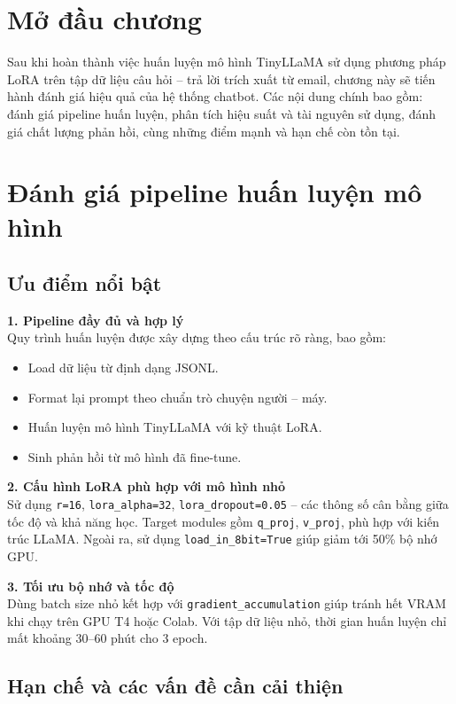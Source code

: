 \documentclass[../DoAn.tex]{subfiles}
\begin{document}
\section{Mở đầu chương}
Sau khi hoàn thành việc huấn luyện mô hình TinyLLaMA sử dụng phương pháp LoRA trên tập dữ liệu câu hỏi – trả lời trích xuất từ email, chương này sẽ tiến hành đánh giá hiệu quả của hệ thống chatbot. Các nội dung chính bao gồm: đánh giá pipeline huấn luyện, phân tích hiệu suất và tài nguyên sử dụng, đánh giá chất lượng phản hồi, cùng những điểm mạnh và hạn chế còn tồn tại.

\section{Đánh giá pipeline huấn luyện mô hình}

\subsection{Ưu điểm nổi bật}

\textbf{1. Pipeline đầy đủ và hợp lý} \\ 
Quy trình huấn luyện được xây dựng theo cấu trúc rõ ràng, bao gồm:
\begin{itemize}
    \item Load dữ liệu từ định dạng JSONL.
    \item Format lại prompt theo chuẩn trò chuyện người – máy.
    \item Huấn luyện mô hình TinyLLaMA với kỹ thuật LoRA.
    \item Sinh phản hồi từ mô hình đã fine-tune.
\end{itemize}

\textbf{2. Cấu hình LoRA phù hợp với mô hình nhỏ} \\ 
Sử dụng \texttt{r=16}, \texttt{lora\_alpha=32}, \texttt{lora\_dropout=0.05} – các thông số cân bằng giữa tốc độ và khả năng học. Target modules gồm \texttt{q\_proj}, \texttt{v\_proj}, phù hợp với kiến trúc LLaMA. Ngoài ra, sử dụng \texttt{load\_in\_8bit=True} giúp giảm tới 50\% bộ nhớ GPU.

\textbf{3. Tối ưu bộ nhớ và tốc độ} \\ 
Dùng batch size nhỏ kết hợp với \texttt{gradient\_accumulation} giúp tránh hết VRAM khi chạy trên GPU T4 hoặc Colab. Với tập dữ liệu nhỏ, thời gian huấn luyện chỉ mất khoảng 30–60 phút cho 3 epoch.

\subsection{Hạn chế và các vấn đề cần cải thiện}
\end{document}
